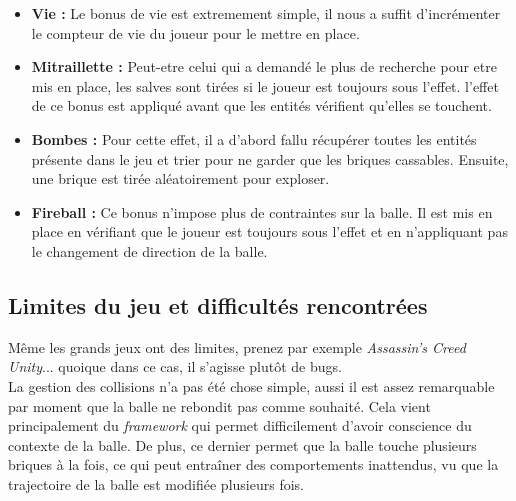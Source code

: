 \documentclass[a4paper,10pt]{article}
\begin{document}
        \begin{itemize}
            \item \textbf{Vie :}
                Le bonus de vie est extremement simple, il nous a suffit d'incrémenter le compteur de vie du joueur
                pour le mettre en place.

            \item \textbf{Mitraillette :}
                Peut-etre celui qui a demandé le plus de recherche pour etre mis en place, les salves sont tirées
                si le joueur est toujours sous l'effet. l'effet de ce bonus est appliqué avant que les entités
                vérifient qu'elles se touchent.

            \item \textbf{Bombes :}
                Pour cette effet, il a d'abord fallu récupérer toutes les entités présente dans le jeu et trier
                pour ne garder que les briques cassables. Ensuite, une brique est tirée aléatoirement pour exploser.

            \item \textbf{Fireball :}
                Ce bonus n'impose plus de contraintes sur la balle. Il est mis en place en vérifiant que le joueur
                est toujours sous l'effet et en n'appliquant pas le changement de direction de la balle.
        \end{itemize}



\subsection{Limites du jeu et difficultés rencontrées}


Même les grands jeux ont des limites, prenez par exemple \textit{Assassin's Creed Unity}... quoique dans ce cas,
il s'agisse plutôt de bugs. \\

La gestion des collisions n'a pas été chose simple, aussi il est assez remarquable par moment que la balle
ne rebondit pas comme souhaité. Cela vient principalement du \textit{framework} qui permet difficilement d'avoir
conscience du contexte de la balle. De plus, ce dernier permet que la balle touche plusieurs briques à la fois,
ce qui peut entraîner des comportements inattendus, vu que la trajectoire de la balle est modifiée plusieurs fois. \\
\end{document}

